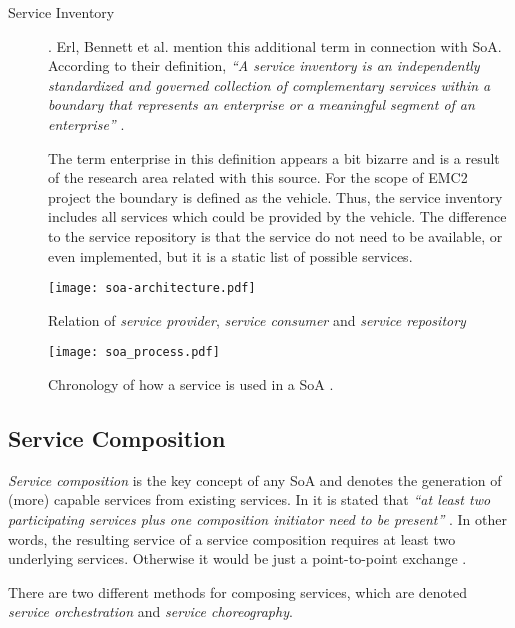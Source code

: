 \begin{description}
\item [Service Inventory] .
Erl, Bennett et al. mention this additional term in connection with SoA. According to their definition, \emph{``A service inventory is an independently standardized and governed collection of complementary services within a boundary that represents an enterprise or a meaningful segment of an enterprise''} \cite[p.41]{erl2011}. 

The term enterprise in this definition appears a bit bizarre and is a result of the research area related with this source. For the scope of EMC2 project the boundary is defined as the vehicle. Thus, the service inventory includes all services which could be provided by the vehicle. The difference to the service repository is that the service do not need to be available, or even implemented, but it is a static list of possible services.
\end{description}

\begin{figure}[!htbp]
\centering
\texttt{[image: soa-architecture.pdf]}
\caption{Relation of \emph{service provider}, \emph{service consumer} and \emph{service repository} \cite{arrowhead} \cite{converge}}
\label{fig:soa_overview}
\end{figure}

\begin{figure}[!htbp]
\centering
\texttt{[image: soa\_process.pdf]}
\caption{Chronology of how a service is used in a SoA \cite{converge}.}
\label{fig:service_cronology}
\end{figure}






\subsection{Service Composition}
\label{sec:service-composition}
\emph{Service composition} is the key concept of any SoA and denotes the generation of (more) capable services from existing services. In \cite{erl2011} it is stated that \emph{``at least two participating services plus one composition initiator need to be present''} \cite[p.40]{erl2011}. In other words, the resulting service of a service composition requires at least two underlying services. Otherwise it would be just a point-to-point exchange \cite[p.40]{erl2011}.

There are two different methods for composing services, which are denoted \emph{service orchestration} and \emph{service choreography}.

